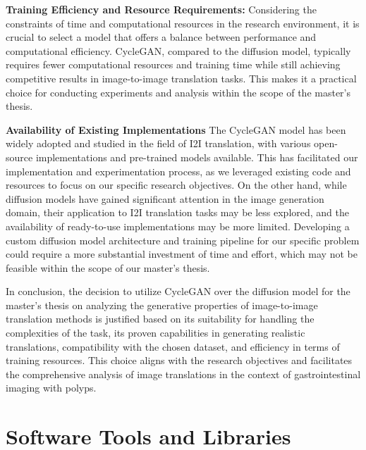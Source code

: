 \documentclass[UKenglish,12pt]{master-style}
\begin{document}
\textbf{Training Efficiency and Resource Requirements:}
Considering the constraints of time and computational resources in the research environment, it is crucial to select a model that offers a balance between performance and computational efficiency.
CycleGAN, compared to the diffusion model, typically requires fewer computational resources and training time while still achieving competitive results in image-to-image translation tasks. This makes it a practical choice for conducting experiments and analysis within the scope of the master's thesis.

\textbf{Availability of Existing Implementations}
The CycleGAN model has been widely adopted and studied in the field of I2I translation, with various open-source implementations and pre-trained models available. This has facilitated our implementation and experimentation process, as we leveraged existing code and resources to focus on our specific research objectives.
On the other hand, while diffusion models have gained significant attention in the image generation domain, their application to I2I translation tasks may be less explored, and the availability of ready-to-use implementations may be more limited. Developing a custom diffusion model architecture and training pipeline for our specific problem could require a more substantial investment of time and effort, which may not be feasible within the scope of our master's thesis.

In conclusion, the decision to utilize CycleGAN over the diffusion model for the master's thesis on analyzing the generative properties of image-to-image translation methods is justified based on its suitability for handling the complexities of the task, its proven capabilities in generating realistic translations, compatibility with the chosen dataset, and efficiency in terms of training resources. This choice aligns with the research objectives and facilitates the comprehensive analysis of image translations in the context of gastrointestinal imaging with polyps.

\section{Software Tools and Libraries}
\end{document}
